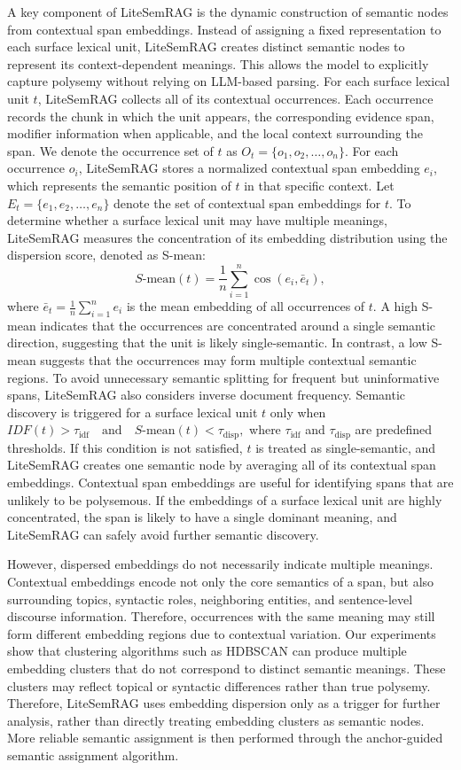 \documentclass[conference]{IEEEtran}
\begin{document}
A key component of LiteSemRAG is the dynamic construction of semantic nodes from contextual span embeddings. Instead of assigning a fixed representation to each surface lexical unit, LiteSemRAG creates distinct semantic nodes to represent its context-dependent meanings. This allows the model to explicitly capture polysemy without relying on LLM-based parsing. For each surface lexical unit $t$, LiteSemRAG collects all of its contextual occurrences. Each occurrence records the chunk in which the unit appears, the corresponding evidence span, modifier information when applicable, and the local context surrounding the span. We denote the occurrence set of $t$ as
$
O_t = \{o_1, o_2, \dots, o_n\}.
$
For each occurrence $o_i$, LiteSemRAG stores a normalized contextual span embedding $e_i$, which represents the semantic position of $t$ in that specific context. Let
$
E_t = \{e_1, e_2, \dots, e_n\}
$
denote the set of contextual span embeddings for $t$. To determine whether a surface lexical unit may have multiple meanings, LiteSemRAG measures the concentration of its embedding distribution using the dispersion score, denoted as S-mean:
\[
S\text{-mean}(t) = \frac{1}{n} \sum_{i=1}^{n} \cos(e_i, \bar{e}_t),
\]
where
$\bar{e}_t = \frac{1}{n} \sum_{i=1}^{n} e_i$
is the mean embedding of all occurrences of $t$. A high S-mean indicates that the occurrences are concentrated around a single semantic direction, suggesting that the unit is likely single-semantic. In contrast, a low S-mean suggests that the occurrences may form multiple contextual semantic regions. To avoid unnecessary semantic splitting for frequent but uninformative spans, LiteSemRAG also considers inverse document frequency. Semantic discovery is triggered for a surface lexical unit $t$ only when
$
IDF(t) > \tau_{\text{idf}}
\quad \text{and} \quad
S\text{-mean}(t) < \tau_{\text{disp}},
$
where $\tau_{\text{idf}}$ and $\tau_{\text{disp}}$ are predefined thresholds. If this condition is not satisfied, $t$ is treated as single-semantic, and LiteSemRAG creates one semantic node by averaging all of its contextual span embeddings. Contextual span embeddings are useful for identifying spans that are unlikely to be polysemous. If the embeddings of a surface lexical unit are highly concentrated, the span is likely to have a single dominant meaning, and LiteSemRAG can safely avoid further semantic discovery.

However, dispersed embeddings do not necessarily indicate multiple meanings. Contextual embeddings encode not only the core semantics of a span, but also surrounding topics, syntactic roles, neighboring entities, and sentence-level discourse information. Therefore, occurrences with the same meaning may still form different embedding regions due to contextual variation. Our experiments show that clustering algorithms such as HDBSCAN can produce multiple embedding clusters that do not correspond to distinct semantic meanings. These clusters may reflect topical or syntactic differences rather than true polysemy. Therefore, LiteSemRAG uses embedding dispersion only as a trigger for further analysis, rather than directly treating embedding clusters as semantic nodes. More reliable semantic assignment is then performed through the anchor-guided semantic assignment algorithm.
\end{document}
